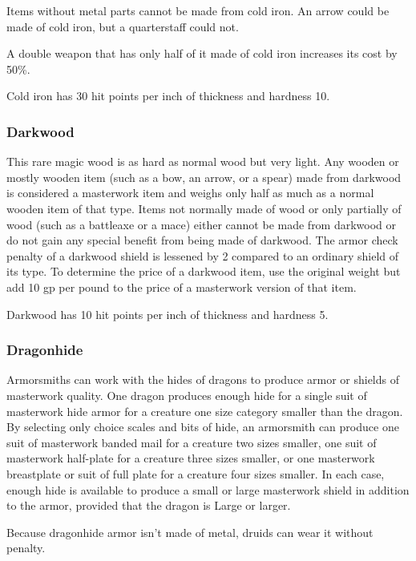 Items without metal parts cannot be made from cold iron. An arrow could be made 
of cold iron, but a quarterstaff could not.

A double weapon that has only half of it made of cold iron increases its cost by 
50\%.

Cold iron has 30 hit points per inch of thickness and hardness 10.

\subsubsection{Darkwood}

This rare magic wood is as hard as normal wood but very light. 
Any wooden or mostly wooden item (such as a bow, an arrow, or a spear) made from 
darkwood is considered a masterwork item and weighs only half as much as a normal 
wooden item of that type. Items not normally made of wood or only partially of 
wood (such as a battleaxe or a mace) either cannot be made from darkwood or do 
not gain any special benefit from being made of darkwood. The armor check penalty 
of a darkwood shield is lessened by 2 compared to an ordinary shield of its type. 
To determine the price of a darkwood item, use the original weight but add 10 gp 
per pound to the price of a masterwork version of that item.

Darkwood has 10 hit points per inch of thickness and hardness 5.

\subsubsection{Dragonhide}

Armorsmiths can work with the hides of dragons to produce 
armor or shields of masterwork quality. One dragon produces enough hide for a single 
suit of masterwork hide armor for a creature one size category smaller than the 
dragon. By selecting only choice scales and bits of hide, an armorsmith can produce 
one suit of masterwork banded mail for a creature two sizes smaller, one suit of 
masterwork half-plate for a creature three sizes smaller, or one masterwork breastplate 
or suit of full plate for a creature four sizes smaller. In each case, enough hide 
is available to produce a small or large masterwork shield in addition to the armor, 
provided that the dragon is Large or larger.

Because dragonhide armor isn't made of metal, druids can wear it without penalty.

